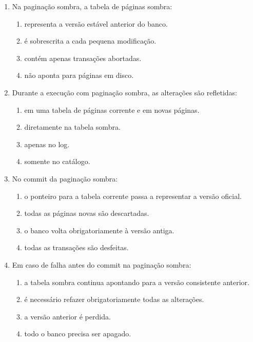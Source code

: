 \documentclass[12pt,a4paper]{article}
\begin{document}
\begin{enumerate}[label=\textbf{Q\arabic*.}]
\item Na paginação sombra, a tabela de páginas sombra:

\begin{enumerate}[label=\alph*)]
    \item representa a versão estável anterior do banco.
    \item é sobrescrita a cada pequena modificação.
    \item contém apenas transações abortadas.
    \item não aponta para páginas em disco.
\end{enumerate}

\item Durante a execução com paginação sombra, as alterações são refletidas:

\begin{enumerate}[label=\alph*)]
    \item em uma tabela de páginas corrente e em novas páginas.
    \item diretamente na tabela sombra.
    \item apenas no log.
    \item somente no catálogo.
\end{enumerate}

\item No commit da paginação sombra:

\begin{enumerate}[label=\alph*)]
    \item o ponteiro para a tabela corrente passa a representar a versão oficial.
    \item todas as páginas novas são descartadas.
    \item o banco volta obrigatoriamente à versão antiga.
    \item todas as transações são desfeitas.
\end{enumerate}

\item Em caso de falha antes do commit na paginação sombra:

\begin{enumerate}[label=\alph*)]
    \item a tabela sombra continua apontando para a versão consistente anterior.
    \item é necessário refazer obrigatoriamente todas as alterações.
    \item a versão anterior é perdida.
    \item todo o banco precisa ser apagado.
\end{enumerate}


\end{enumerate}
\end{document}
